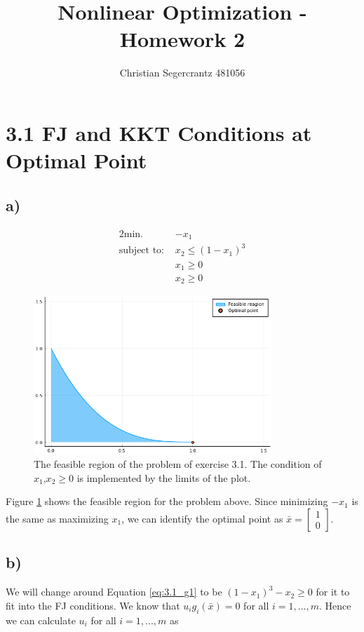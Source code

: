 \documentclass{article}
\title{Nonlinear Optimization - Homework 2 }
\author{Christian Segercrantz 481056}
\begin{document}
\maketitle
\pagebreak
\section*{3.1 FJ and KKT Conditions at Optimal Point}
\subsection*{a)}
	\begin{alignat}{2}
		\text{min. } & -x_1 \\
		\text{subject to: } & x_2 \leq (1-x_1)^3 \label{eq:3.1_g1}\\
		&x_1 \geq 0 \\
		& x_2 \geq 0
	\end{alignat}
	\begin{figure}[H]
		\includegraphics[width=0.8\textwidth]{3_1.png}
		\caption{The feasible region of the problem of exercise 3.1. The condition of $x_1$,$x_2\geq 0$ is implemented by the limits of the plot.}
		\label{fig:1a}
	\end{figure}
	Figure \ref{fig:1a} shows the feasible region for the problem above. Since minimizing $-x_1$ is the same as maximizing $x_1$, we can identify the optimal point as $\bar{x} = \begin{bmatrix} 1 \\ 0 \end{bmatrix}$.
\subsection*{b)}
	We will change around Equation \ref{eq:3.1_g1} to be $(1-x_1)^3-x_2 \geq 0$ for it to fit into the FJ conditions. We know that $u_i g_i(\bar{x}) = 0$ for all $i= 1,...,m$. Hence we can calculate $u_i$ for all $i= 1,...,m$ as 
	
\end{document}
